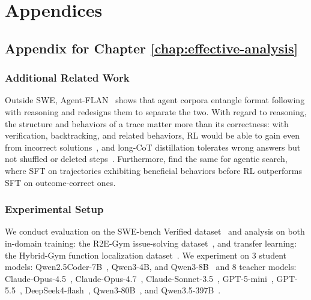 \appendix
\part{Appendices}
\label{part:appendices}

\chapter{Appendix for Chapter \ref{chap:effective-analysis}}
\label{chap:appendix-effective-analysis}

\begingroup
{}

\section{Additional Related Work}
Outside SWE, Agent-FLAN~\citep{chen2024agentflan} shows that agent corpora entangle format following with reasoning and redesigns them to separate the two. With regard to reasoning, the structure and behaviors of a trace matter more than its correctness: with verification, backtracking, and related behaviors, RL would be able to gain even from incorrect solutions~\citep{gandhi2025cognitive}, and long-CoT distillation tolerates wrong answers but not shuffled or deleted steps~\citep{li2025structure}. Furthermore, \citet{beneficial-reasoning} find the same for agentic search, where SFT on trajectories exhibiting beneficial behaviors before RL outperforms SFT on outcome-correct ones. 




\section{Experimental Setup}
\label{catradar:sec:analysis-setup}
We conduct evaluation on the SWE-bench Verified dataset~\citep{swebench} and analysis on both in-domain training: the R2E-Gym issue-solving dataset~\citep{R2EGym}, and transfer learning: the Hybrid-Gym function localization dataset~\citep{hybrid-gym}. 
We experiment on 3 student models: Qwen2.5Coder-7B~\citep{qwen25coder}, Qwen3-4B, and Qwen3-8B~\citep{qwen3} and 8 teacher models: Claude-Opus-4.5~\citep{claude45}, Claude-Opus-4.7~\citep{claude47}, Claude-Sonnet-3.5~\citep{claude35}, GPT-5-mini~\citep{gpt5}, GPT-5.5~\citep{gpt55}, DeepSeek4-flash~\citep{deepseekv4}, Qwen3-80B~\citep{qwen3}, and Qwen3.5-397B~\citep{qwen35}.

